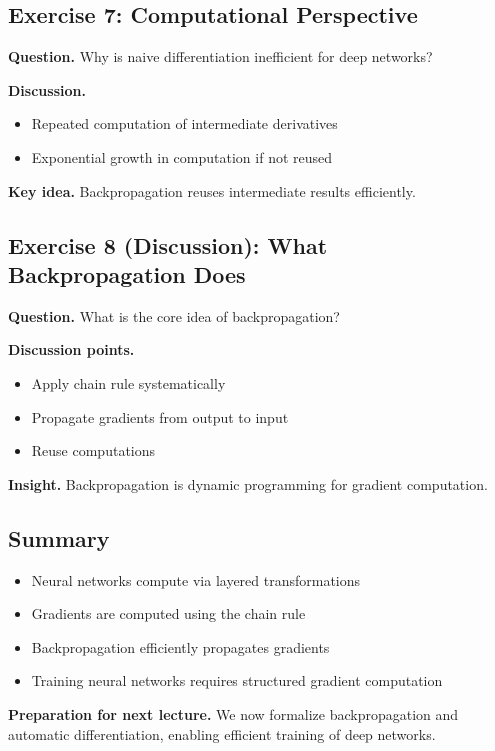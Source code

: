 \subsection{Exercise 7: Computational Perspective}

\textbf{Question.}  
Why is naive differentiation inefficient for deep networks?

\medskip

\noindent
\textbf{Discussion.}

\begin{itemize}
    \item Repeated computation of intermediate derivatives
    \item Exponential growth in computation if not reused
\end{itemize}

\medskip

\noindent
\textbf{Key idea.}  
Backpropagation reuses intermediate results efficiently.

\subsection{Exercise 8 (Discussion): What Backpropagation Does}

\textbf{Question.}  
What is the core idea of backpropagation?

\medskip

\noindent
\textbf{Discussion points.}

\begin{itemize}
    \item Apply chain rule systematically
    \item Propagate gradients from output to input
    \item Reuse computations
\end{itemize}

\medskip

\noindent
\textbf{Insight.}  
Backpropagation is dynamic programming for gradient computation.

\subsection{Summary}

\begin{itemize}
    \item Neural networks compute via layered transformations
    \item Gradients are computed using the chain rule
    \item Backpropagation efficiently propagates gradients
    \item Training neural networks requires structured gradient computation
\end{itemize}

\medskip

\noindent
\textbf{Preparation for next lecture.}  
We now formalize backpropagation and automatic differentiation, enabling efficient training of deep networks.
